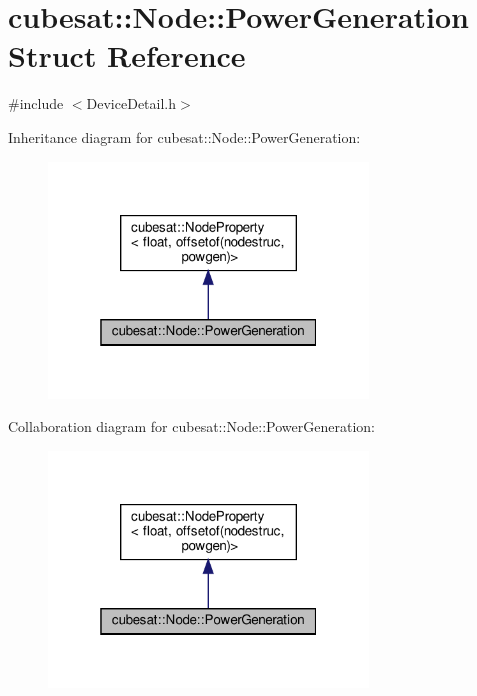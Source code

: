 \hypertarget{structcubesat_1_1Node_1_1PowerGeneration}{}\section{cubesat\+:\+:Node\+:\+:Power\+Generation Struct Reference}
\label{structcubesat_1_1Node_1_1PowerGeneration}


{\ttfamily \#include $<$Device\+Detail.\+h$>$}



Inheritance diagram for cubesat\+:\+:Node\+:\+:Power\+Generation\+:
\nopagebreak
\begin{figure}[H]
\begin{center}
\leavevmode
\includegraphics[width=241pt]{structcubesat_1_1Node_1_1PowerGeneration__inherit__graph}
\end{center}
\end{figure}


Collaboration diagram for cubesat\+:\+:Node\+:\+:Power\+Generation\+:
\nopagebreak
\begin{figure}[H]
\begin{center}
\leavevmode
\includegraphics[width=241pt]{structcubesat_1_1Node_1_1PowerGeneration__coll__graph}
\end{center}
\end{figure}
